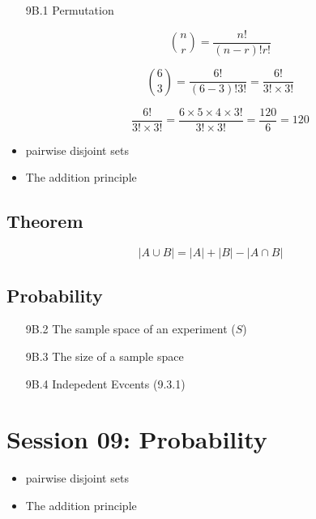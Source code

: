 \documentclass[12pt]{report}
\begin{document}
		\begin{itemize}
			\item[9B.1] Permutation
			
			\[ {n \choose r} = \frac{n!}{(n-r)! r!} \]
			
			
			\[ {6 \choose 3} = \frac{6!}{(6-3)! 3!} = \frac{6!}{3! \times 3!}\]
			
			
			\[ \frac{6!}{3! \times 3!} = \frac{6 \times 5 \times 4 \times 3!}{3! \times 3!} = \frac{120}{6} = 120\]
		\end{itemize}
		

		
		\begin{itemize}
			\item pairwise disjoint sets
			\item The addition principle
		\end{itemize}
		\subsection*{Theorem}
		\[ |A \cup B| = |A| + |B| - |A \cap B|  \]
		
		\subsection*{Probability}
		\begin{itemize}
			\item[9B.2] The sample space of an experiment ($S$)
			\item[9B.3] The size of a sample space
			\item[9B.4] Indepedent Evcents (9.3.1)
		\end{itemize}

\section*{Session 09: Probability}
	
		\begin{itemize}
			\item pairwise disjoint sets
			\item The addition principle
		\end{itemize}
\end{document}
